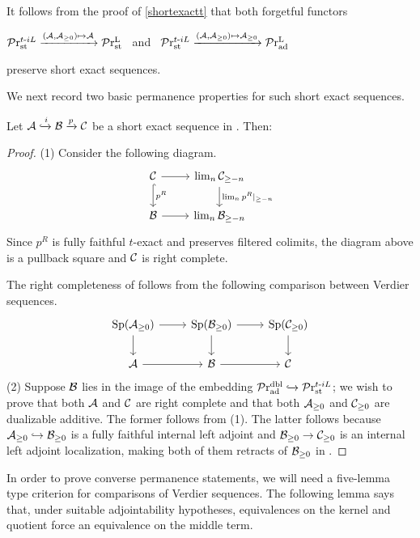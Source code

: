 \documentclass[a4paper,10pt, oneside]{amsart}
\begin{document}
	\begin{rem}
		It follows from the proof of \cref{shortexactt} that both forgetful functors \begin{center}
			$\mathcal{P}\mathrm{r}^{t\text{-}iL}_{\mathrm{st}}\xrightarrow{(\mathcal{A},\mathcal{A}_{\geq0})\mapsto \mathcal{A}} \mathcal{P}\mathrm{r}_{\mathrm{st}}^\mathrm{L}$ \, and \, $\mathcal{P}\mathrm{r}^{t\text{-}iL}_{\mathrm{st}} \xrightarrow{(\mathcal{A},\mathcal{A}_{\geq0})\mapsto \mathcal{A}_{\geq0}}\mathcal{P}\mathrm{r}_{\mathrm{ad}}^\mathrm{L}$
		\end{center} preserve short exact sequences.
	\end{rem}
	We next record two basic permanence properties for such short exact sequences.
	
\begin{prop}\label{propertycoffib}
		Let $\mathcal{A}\xhookrightarrow{i}\mathcal{B}\xrightarrow{p}\mathcal{C}$ be a short exact sequence in \prtil. Then:
\end{prop}
\begin{proof}
	(1) Consider the following diagram.
	$$\begin{tikzcd}
		\mcc \arrow[d, "p^R", hook] \arrow[r] & \lim_n \mcc_{\geq -n} \arrow[d, "\lim_n p^R|_{\geq -n}"] \\
		\mcb \arrow[r]                        & \lim_n \mcb_{\geq -n}                                  
	\end{tikzcd}$$
	Since $p^R$ is  fully faithful $t$-exact and preserves filtered colimits, the diagram above is a pullback square and $\mathcal{C}$ is right complete.
	
	The right completeness of \mca follows from the following comparison between Verdier sequences.
		$$\begin{tikzcd}
		\opsp(\mca_{\geq0}) \arrow[d] \arrow[r] & \opsp(\mcb_{\geq0}) \arrow[d] \arrow[r] & \opsp(\mcc_{\geq0}) \arrow[d] \\
		\mca \arrow[r]                                  & \mcb \arrow[r]                          & \mcc                                 
	\end{tikzcd}$$
	(2) Suppose $\mathcal{B}$ lies in the image of the embedding $\mathcal{P}\mathrm{r}_{\mathrm{ad}}^{\mathrm{dbl}}\xhookrightarrow{}\mathcal{P}\mathrm{r}^{t\text{-}iL}_{\mathrm{st}}$; we wish to prove that both $\mathcal{A}$ and $\mathcal{C}$ are right complete and that both $\mathcal{A}_{\geq 0}$ and $\mathcal{C}_{\geq 0}$ are dualizable additive. The former follows from (1). The latter follows because $\mathcal{A}_{\geq 0}\hookrightarrow \mathcal{B}_{\geq 0}$ is a fully faithful internal left adjoint and $\mathcal{B}_{\geq0}\to \mathcal{C}_{\geq 0}$ is an internal left adjoint localization, making both of them retracts of $\mathcal{B}_{\geq 0}$ in \prlad.
\end{proof}
In order to prove converse permanence statements, we will need a five-lemma type criterion for comparisons of Verdier sequences. The following lemma says that, under suitable adjointability hypotheses, equivalences on the kernel and quotient force an equivalence on the middle term.
\end{document}
